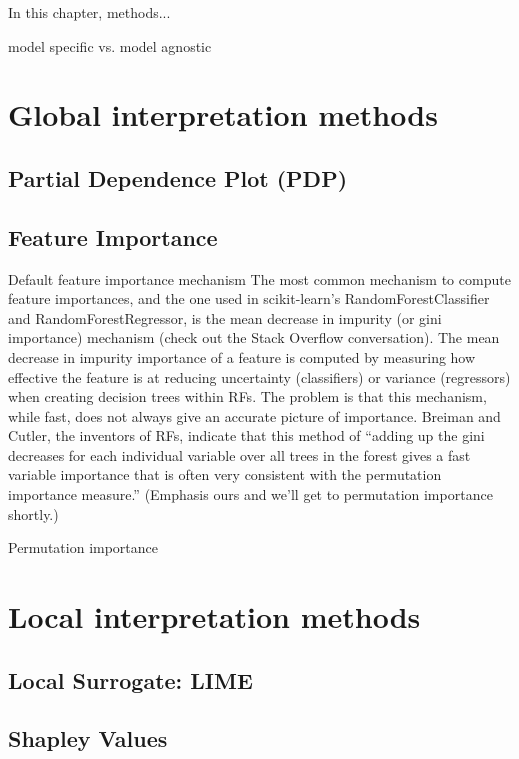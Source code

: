 In this chapter, methods...

model specific vs. model agnostic

\section{Global interpretation methods}

\subsection{Partial Dependence Plot (PDP)}

\subsection{Feature Importance}

Default feature importance mechanism
	The most common mechanism to compute feature importances, and the one used in scikit-learn's RandomForestClassifier and RandomForestRegressor, is the mean decrease in impurity (or gini importance) mechanism (check out the Stack Overflow conversation). The mean decrease in impurity importance of a feature is computed by measuring how effective the feature is at reducing uncertainty (classifiers) or variance (regressors) when creating decision trees within RFs. The problem is that this mechanism, while fast, does not always give an accurate picture of importance. Breiman and Cutler, the inventors of RFs, indicate that this method of “adding up the gini decreases for each individual variable over all trees in the forest gives a fast variable importance that is often very consistent with the permutation importance measure.” (Emphasis ours and we'll get to permutation importance shortly.)

Permutation importance

\section{Local interpretation methods}

\subsection{Local Surrogate: LIME}

\subsection{Shapley Values}

